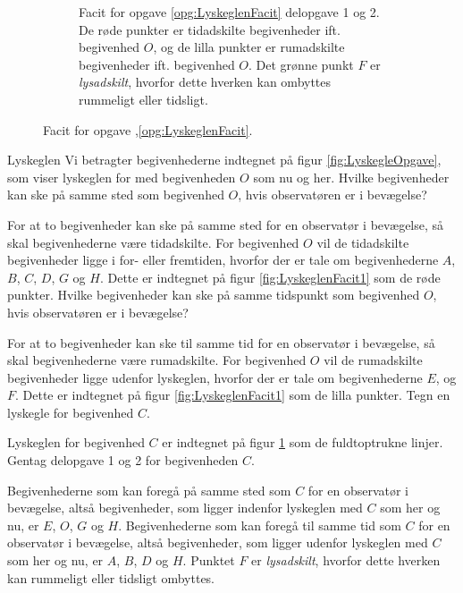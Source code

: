 \begin{figure}[t]
\begin{subfigure}[t]{.45\textwidth}
        \caption{Facit for opgave \ref{opg:LyskeglenFacit} delopgave 1 og 2. De røde punkter er tidadskilte begivenheder ift. begivenhed $O$, og de lilla punkter er rumadskilte begivenheder ift. begivenhed $O$. Det grønne punkt $F$ er \emph{lysadskilt}, hvorfor dette hverken kan ombyttes rummeligt eller tidsligt.}
        \label{fig:LyskeglenFacit2}
    \end{subfigure}
    \caption{Facit for opgave \thechapter,\ref{opg:LyskeglenFacit}.}
    \label{fig:LyskeglenFacit}
\end{figure}

\begin{opgave}{Lyskeglen} \label{opg:LyskeglenFacit}
Vi betragter begivenhederne indtegnet på figur \ref{fig:LyskegleOpgave}, som viser lyskeglen for med begivenheden $O$ som nu og her.
\opg Hvilke begivenheder kan ske på samme sted som begivenhed $O$, hvis observatøren er i bevægelse?

For at to begivenheder kan ske på samme sted for en observatør i bevægelse, så skal begivenhederne være tidadskilte. For begivenhed $O$ vil de tidadskilte begivenheder ligge i for- eller fremtiden, hvorfor der er tale om begivenhederne $A$, $B$, $C$, $D$, $G$ og $H$. Dette er indtegnet på figur \ref{fig:LyskeglenFacit1} som de røde punkter.
%
\opg Hvilke begivenheder kan ske på samme tidspunkt som begivenhed $O$, hvis observatøren er i bevægelse?

For at to begivenheder kan ske til samme tid for en observatør i bevægelse, så skal begivenhederne være rumadskilte. For begivenhed $O$ vil de rumadskilte begivenheder ligge udenfor lyskeglen, hvorfor der er tale om begivenhederne $E$, og $F$. Dette er indtegnet på figur \ref{fig:LyskeglenFacit1} som de lilla punkter.
%
\opg Tegn en lyskegle for begivenhed $C$.

Lyskeglen for begivenhed $C$ er indtegnet på figur \ref{fig:LyskeglenFacit2} som de fuldtoptrukne linjer.
%
\opg Gentag delopgave 1 og 2 for begivenheden $C$.

Begivenhederne som kan foregå på samme sted som $C$ for en observatør i bevægelse, altså begivenheder, som ligger indenfor lyskeglen med $C$ som her og nu, er $E$, $O$, $G$ og $H$. Begivenhederne som kan foregå til samme tid som $C$ for en observatør i bevægelse, altså begivenheder, som ligger udenfor lyskeglen med $C$ som her og nu, er $A$, $B$, $D$ og $H$. Punktet $F$ er \emph{lysadskilt}, hvorfor dette hverken kan rummeligt eller tidsligt ombyttes.
\end{opgave}